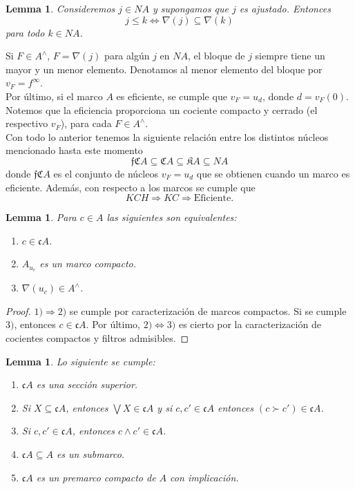 \documentclass[11pt]{amsart}
\theoremstyle{plain}
\newtheorem{lem}[thm]{Lemma}
\theoremstyle{definition}
\begin{document}
\begin{lem}\label{cn ajustado}
    Consideremos $j\in NA$ y supongamos que $j$ es ajustado. Entonces
    \[
    j\leq k\Leftrightarrow \nabla(j)\subseteq \nabla(k)
    \]
    para todo $k\in NA$.
\end{lem}

Si $F\in A^\wedge$, $F=\nabla(j)$ para algún $j$ en $NA$, el bloque de $j$ siempre tiene un mayor y un menor elemento. Denotamos al menor elemento del bloque por  $v_F=f^\infty$.\\

Por último, si el marco $A$ es eficiente, se cumple que $v_F=u_d$, donde $d=v_F(0)$. Notemos que la eficiencia proporciona un cociente compacto y cerrado (el respectivo $v_F$), 
para cada $F\in A^\wedge$.\\

Con todo lo anterior tenemos la siguiente relación entre los distintos núcleos mencionado hasta este momento
\[
\mathfrak{f}\mathfrak{C}A\subseteq \mathfrak{C}A\subseteq \mathfrak{K}A\subseteq NA
\]
donde $\mathfrak{f}\mathfrak{C}A$ es el conjunto de núcleos $v_F=u_d$ que se obtienen cuando un marco es eficiente. Además, con respecto a los marcos se cumple que
\[
KCH\Rightarrow KC\Rightarrow \mbox{Eficiente}.
\]

\begin{lem}\label{Lema2.2}
    Para $c\in A$ las siguientes son equivalentes:
    \begin{enumerate}
        \item $c\in \mathfrak{c}A$.
        \item $A_{u_c}$ es un marco compacto.
        \item $\nabla(u_c)\in A^\wedge$.
    \end{enumerate}
\end{lem}

\begin{proof}
    $1)\Rightarrow 2)$ se cumple por caracterización de marcos compactos. Si se cumple $3)$, entonces $c\in \mathfrak{c}A$. Por último, $2) \Leftrightarrow 3)$ es cierto por la caracterización de cocientes compactos y filtros admisibles. 
\end{proof}

\begin{lem}\label{Lema2.3}
    Lo siguiente se cumple:
    \begin{enumerate}
        \item $\mathfrak{c}A$ es una sección superior.
        \item Si $X\subseteq \mathfrak{c}A$, entonces $\bigvee X\in \mathfrak{c}A$ y si $c, c'\in \mathfrak{c}A$ entonces $(c\succ c')\in \mathfrak{c}A$.
        \item Si $c, c'\in \mathfrak{c}A$, entonces $c\wedge c'\in \mathfrak{c}A$.
        \item $\mathfrak{c}A\subseteq A$ es un submarco.
        \item $\mathfrak{c}A$ es un premarco compacto de $A$ con implicación.
    \end{enumerate}
\end{lem}
\end{document}
